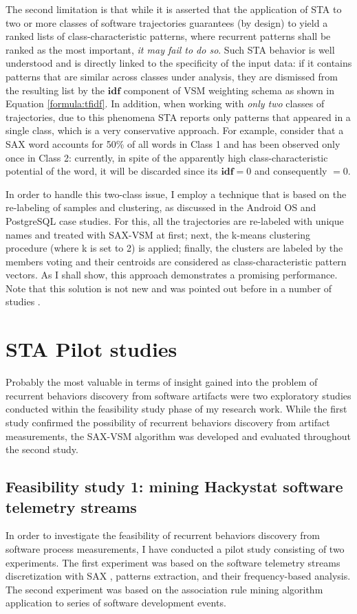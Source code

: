 The second limitation is that while it is asserted that the application of STA to two or more classes of software trajectories guarantees (by design) to yield a ranked lists of class-characteristic patterns, where recurrent patterns shall be ranked as the most important, \textit{it may fail to do so}. Such STA behavior is well understood and is directly linked to the specificity of the input data: if it contains patterns that are similar across classes under analysis, they are dismissed from the resulting list by the $\textbf{idf}$ component of VSM weighting schema as shown in Equation \eqref{formula:tfidf}. In addition, when working with \textit{only two} classes of trajectories, due to this phenomena STA reports only patterns that appeared in a single class, which is a very conservative approach. For example, consider that a SAX word accounts for 50\% of all words in Class 1 and has been observed only once in Class 2: currently, in spite of the apparently high class-characteristic potential of the word, it will be discarded since its $\textbf{idf}=0$ and consequently \tfidf$=0$.

In order to handle this two-class issue, I employ a technique that is based on the re-labeling of samples and clustering, as discussed in the Android OS and PostgreSQL case studies. For this, all the trajectories are re-labeled with unique names and treated with SAX-VSM at first; next, the k-means clustering procedure (where k is set to 2) is applied; finally, the clusters are labeled by the members voting and their centroids are considered as class-characteristic pattern vectors. As I shall show, this approach demonstrates a promising performance. Note that this solution is not new and was pointed out before in a number of studies \cite{classification_centroids} \cite{salton-71} \cite{intro_ir_Manning}.

\section{STA Pilot studies}
Probably the most valuable in terms of insight gained into the problem of recurrent behaviors discovery from software artifacts were two exploratory studies conducted within the feasibility study phase of my research work. While the first study confirmed the possibility of recurrent behaviors discovery from artifact measurements, the SAX-VSM algorithm was developed and evaluated throughout the second study.

\subsection{Feasibility study 1: mining Hackystat software telemetry streams}
In order to investigate the feasibility of recurrent behaviors discovery from software process measurements, I have conducted a pilot study consisting of two experiments. The first experiment was based on the software telemetry streams discretization with SAX \cite{citeulike:2821475}, patterns extraction, and their frequency-based analysis. The second experiment was based on the association rule mining algorithm application to series of software development events.

